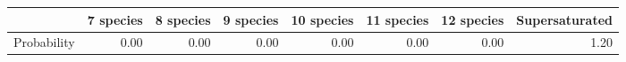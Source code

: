 \begin{table}[ht]
\centering
\begin{tabular}{rrrrrrrr}
  \hline
 & 7 species & 8 species & 9 species & 10 species & 11 species & 12 species & Supersaturated \\ 
  \hline
Probability & 0.00 & 0.00 & 0.00 & 0.00 & 0.00 & 0.00 & 1.20 \\ 
   \hline
\end{tabular}
\end{table}
